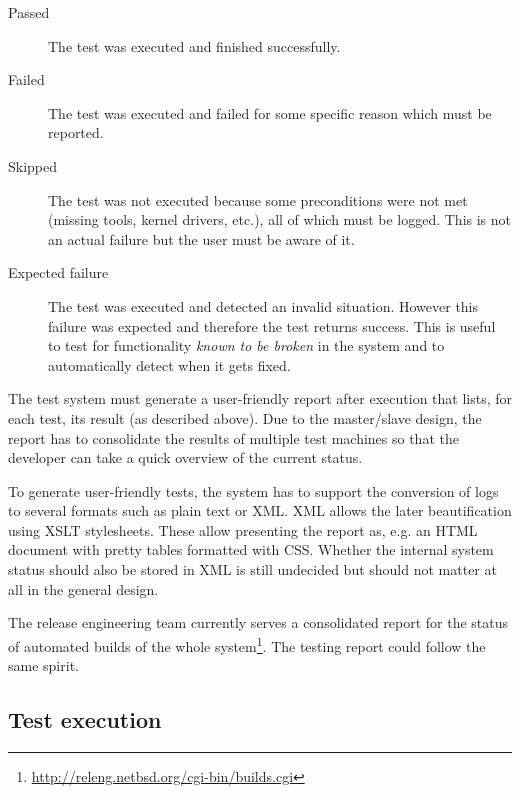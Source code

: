 \documentclass[a4paper,10pt]{article}
\begin{document}
\begin{description}

\item [Passed]
The test was executed and finished successfully.

\item [Failed]
The test was executed and failed for some specific reason which must be
reported.

\item [Skipped]
The test was not executed because some preconditions were not met
(missing tools, kernel drivers, etc.), all of which must be logged.  This
is not an actual failure but the user must be aware of it.

\item [Expected failure]
The test was executed and detected an invalid situation.  However this
failure was expected and therefore the test returns success.  This is
useful to test for functionality \emph{known to be broken} in the system
and to automatically detect when it gets fixed.

\end{description}

The test system must generate a user-friendly report after execution that
lists, for each test, its result (as described above).  Due to the
master/slave design, the report has to consolidate the results of multiple
test machines so that the developer can take a quick overview of the
current status.

To generate user-friendly tests, the system has to support the conversion
of logs to several formats such as plain text or XML.  XML allows the later
beautification using XSLT stylesheets.  These allow presenting the report
as, e.g. an HTML document with pretty tables formatted with CSS.  Whether
the internal system status should also be stored in XML is still undecided
but should not matter at all in the general design.

The release engineering team currently serves a consolidated report for
the status of automated builds of the whole
system\footnote{\url{http://releng.netbsd.org/cgi-bin/builds.cgi}}.  The
testing report could follow the same spirit.


\subsection{Test execution}
\label{sec:execution}
\end{document}
